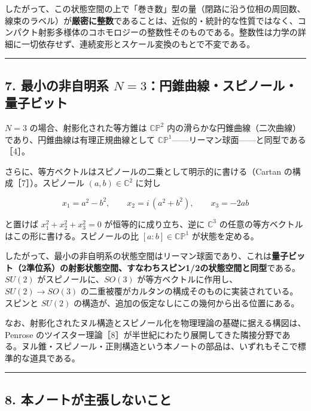 \documentclass[
  a4paper,
]{ltjsarticle}
\begin{document}
したがって、この状態空間の上で「巻き数」型の量（閉路に沿う位相の周回数、線束のラベル）が\textbf{厳密に整数}であることは、近似的・統計的な性質ではなく、コンパクト射影多様体のコホモロジーの整数性そのものである。整数性は力学の詳細に一切依存せず、連続変形とスケール変換のもとで不変である。

\begin{center}\rule{0.5\linewidth}{0.5pt}\end{center}

\subsection{\texorpdfstring{7. 最小の非自明系
\(N=3\)：円錐曲線・スピノール・量子ビット}{7. 最小の非自明系 N=3：円錐曲線・スピノール・量子ビット}}\label{ux6700ux5c0fux306eux975eux81eaux660eux7cfb-n3ux5186ux9310ux66f2ux7ddaux30b9ux30d4ux30ceux30fcux30ebux91cfux5b50ux30d3ux30c3ux30c8}

\(N=3\) の場合、射影化された等方錐は \(\mathbb{CP}^2\)
内の滑らかな円錐曲線（二次曲線）であり、円錐曲線は有理正規曲線として
\(\mathbb{CP}^1\)------リーマン球面------と同型である［4］。

さらに、等方ベクトルはスピノールの二乗として明示的に書ける（Cartan
の構成［7］）。スピノール \((a,b)\in\mathbb C^2\) に対し

\[
x_1=a^2-b^2,\qquad x_2=i\,(a^2+b^2),\qquad x_3=-2ab
\]

と置けば \(x_1^2+x_2^2+x_3^2=0\) が恒等的に成り立ち、逆に
\(\mathbb C^3\) の任意の等方ベクトルはこの形に書ける。スピノールの比
\([a:b]\in\mathbb{CP}^1\) が状態を定める。

したがって、最小の非自明系の状態空間はリーマン球面であり、これは\textbf{量子ビット（2準位系）の射影状態空間、すなわちスピン1/2の状態空間と同型}である。\(SU(2)\)
がスピノールに、\(SO(3)\) が等方ベクトルに作用し、\(SU(2)\to SO(3)\)
の二重被覆がカルタンの構成そのものに実装されている。スピンと \(SU(2)\)
の構造が、追加の仮定なしにこの幾何から出る位置にある。

なお、射影化されたヌル構造とスピノール化を物理理論の基礎に据える構図は、Penrose
のツイスター理論［8］が半世紀にわたり展開してきた隣接分野である。ヌル錐・スピノール・正則構造という本ノートの部品は、いずれもそこで標準的な道具である。

\begin{center}\rule{0.5\linewidth}{0.5pt}\end{center}

\subsection{8.
本ノートが主張しないこと}\label{ux672cux30ceux30fcux30c8ux304cux4e3bux5f35ux3057ux306aux3044ux3053ux3068}
\end{document}
